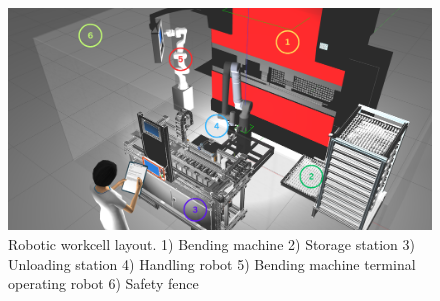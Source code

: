 \begin{figure}[h]
    \centering
    \includegraphics[width=\textwidth]{figures/robotic-workcell1.png}
    \caption{Robotic workcell layout. 1) Bending machine 2) Storage station 3) Unloading station 4) Handling robot 5) Bending machine terminal operating robot 6) Safety fence}
    \label{fig:robotic-workcell}
\end{figure}

